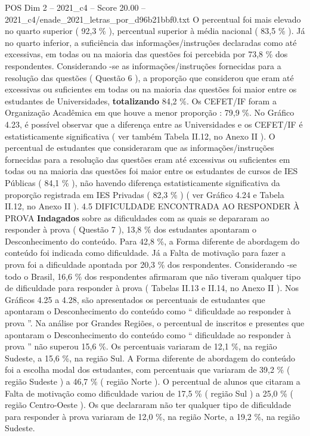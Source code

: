 \begin{textsample}{POS Dim 2 – 2021\_c4 – Score 20.00 – 2021\_c4/enade\_2021\_letras\_por\_d96b21bbf0.txt}
O percentual foi mais elevado no quarto superior ( 92,3 \% ), percentual superior à média nacional ( 83,5 \% ).
Já no quarto inferior, a suficiência das informações/instruções declaradas como até excessivas, em todas ou na maioria das questões foi percebida por 73,8 \% dos respondentes.
Considerando -se as informações/instruções fornecidas para a resolução das questões ( Questão 6 ), a proporção que considerou que eram até excessivas ou suficientes em todas ou na maioria das questões foi maior entre os estudantes de Universidades, \textbf{totalizando} 84,2 \%.
Os CEFET/IF foram a Organização Acadêmica em que houve a menor proporção : 79,9 \%.
No Gráfico 4.23, é possível observar que a diferença entre as Universidades e os CEFET/IF é estatisticamente significativa ( ver também Tabela II.12, no Anexo II ).
O percentual de estudantes que consideraram que as informações/instruções fornecidas para a resolução das questões eram até excessivas ou suficientes em todas ou na maioria das questões foi maior entre os estudantes de cursos de IES Públicas ( 84,1 \% ), não havendo diferença estatisticamente significativa da proporção registrada em IES Privadas ( 82,3 \% ) ( ver Gráfico 4.24 e Tabela II.12, no Anexo II ). 4.5 DIFICULDADE ENCONTRADA AO RESPONDER À PROVA \textbf{Indagados} sobre as dificuldades com as quais se depararam ao responder à prova ( Questão 7 ), 13,8 \% dos estudantes apontaram o Desconhecimento do conteúdo.
Para 42,8 \%, a Forma diferente de abordagem do conteúdo foi indicada como dificuldade.
Já a Falta de motivação para fazer a prova foi a dificuldade apontada por 20,3 \% dos respondentes.
Considerando -se todo o Brasil, 16,6 \% dos respondentes afirmaram que não tiveram qualquer tipo de dificuldade para responder à prova ( Tabelas II.13 e II.14, no Anexo II ).
Nos Gráficos 4.25 a 4.28, são apresentados os percentuais de estudantes que apontaram o Desconhecimento do conteúdo como “ dificuldade ao responder à prova ”.
Na análise por Grandes Regiões, o percentual de inscritos e presentes que apontaram o Desconhecimento do conteúdo como “ dificuldade ao responder à prova ” não superou 15,6 \%.
Os percentuais variaram de 12,1 \%, na região Sudeste, a 15,6 \%, na região Sul.
A Forma diferente de abordagem do conteúdo foi a escolha modal dos estudantes, com percentuais que variaram de 39,2 \% ( região Sudeste ) a 46,7 \% ( região Norte ).
O percentual de alunos que citaram a Falta de motivação como dificuldade variou de 17,5 \% ( região Sul ) a 25,0 \% ( região Centro-Oeste ).
Os que declararam não ter qualquer tipo de dificuldade para responder à prova variaram de 12,0 \%, na região Norte, a 19,2 \%, na região Sudeste.

\end{textsample}
